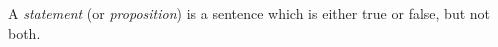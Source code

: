 \guard

\begin{defn}
\label{defn:statement}
  A \emph{statement} (or \emph{proposition}) is a sentence which is either true or false, but not both.
\end{defn}

